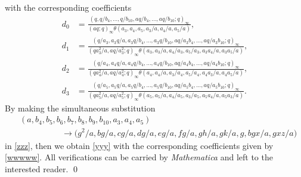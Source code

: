 \documentclass[xits,review,sort&compress]{elsarticle}
\numberwithin{equation}{section}
\begin{document}
with the corresponding coefficients
\begin{align*}
d_0&=\frac{\left(q,q / b_{4}, \ldots, q / b_{10}, a q / b_{4}, \ldots, a q / b_{10} ; q\right)_{\infty}}{\left(a q; q\right)_{\infty}\theta(a_{3}, a_4, a_{5},a_{3} / a, a_{4} / a, a_{5} / a)},\\
  d_1 &= \frac{\left( q / a_{3},a_{3} q / a,  a_{3} q / b_{4},\ldots, a_{3} q / b_{10},a q / a_{3} b_{4}, \ldots, a q / a_{3} b_{10} ; q\right)_{\infty}}{\left(q a_{3}^{2} / a, a q / a_{3}^{2} ; q\right)_{\infty}\theta(a_{3},a_{3} / a, a_{4} / a_{3},  a_{5} / a_{3},a_{3} a_{4} / a, a_{3} a_{5} / a)},\\
  d_2 &=\frac{\left(q / a_{4},a_{4} q / a, a_{4} q / b_{4}, \ldots, a_{4} q / b_{10}, a q / a_{4}b_{4}, \ldots, a q / a_{4} b_{10} ; q\right)_{\infty}}{\left(q a_{4}^{2} / a, a q / a_{4}^{2} ; q\right)_{\infty}\theta(a_{4},a_{4} / a,  a_{3} / a_{4},  a_{5} / a_{4},a_{4} a_{3} / a, a_{4} a_{5} / a)},\\
  d_3 &=\frac{\left(q / a_{5},a_{5} q / a,a_{5} q / b_{4}, \ldots, a_{5} q / b_{10}, a q / a_{5} b_{4}, \ldots,{a q / a_{5} b_{10}} ; q\right)_{\infty}}{\left(q a_{5}^{2} / a, a q / a_{5}^{2} ; q\right)_{\infty}\theta(a_{5},a_{5} / a, a_{4} / a_{5},  a_{3}/ a_{5},a_{5} a_{4} / a, a_{5}a_{3} / a)}.
\end{align*}
By making the simultaneous substitution
\begin{align*}
&(a,b_4,b_5,b_6,b_7,b_8,b_9,b_{10},a_3,a_4,a_5)\\
&\qquad\qquad\quad\to\big(g^2/a, b g/a,c g/a,d g/a,e g/a, f g/a,g h/a,g k/a, g,b g x/a,g x z/a\big)
\end{align*}
in \eqref{zzz}, then we obtain  \eqref{yyy}
 with the corresponding coefficients given by \eqref{wwwww}. All verifications can be carried by \emph{Mathematica} and left to the interested reader.
\qed
\end{document}
